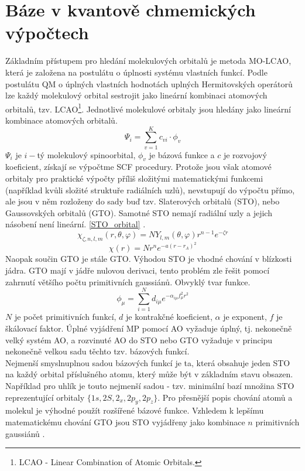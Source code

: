 \documentclass[
  digital, %
  table,   %
  lof,     %
  lot,     %
  oneside,
]{fithesis3}
\begin{document}
\section{Báze v kvantově chmemických výpočtech}
Základním přístupem pro hledání molekulových orbitalů je metoda MO-LCAO, která je založena na postulátu o úplnosti systému vlastních funkcí.
Podle postulátu QM o úplných vlastních hodnotách uplných Hermitovských operátorů lze každý molekulový orbital sestrojit jako lineární kombinaci atomových orbitalů, tzv. LCAO\footnote{LCAO - Linear Combination of Atomic Orbitals.}. Jednotlivé molekulové orbitaly jsou hledány jako lineární kombinace atomových orbitalů.
\begin{equation}
\Psi_i = \sum_{v=1}^{K}c_{vi} \cdot \phi_{v}
\end{equation}
$\Psi_i$ je $i-$tý molekulový spinoorbital, $\phi_{v}$ je bázová funkce a $c$ je rozvojový koeficient, získají se výpočtme SCF procedury. Protože jsou však atomové orbitaly pro praktické výpočty příliš složitými matematickými funkcemi (například kvůli složité struktuře radiálních uzlů), nevstupují do výpočtu přímo, ale jsou v něm rozloženy do sady buď tzv. Slaterových orbitalů (STO), nebo Gaussovských orbitalů (GTO). Samotné STO nemají radiální uzly a jejich násobení není lineární.
\ref{STO_orbital} \cite{jensen2007introduction}.
\begin{equation}
\chi_{\zeta, n, l, m}(r, \theta, \varphi) = NY_{l,m} (\theta, \varphi) r^{n-1} e^{-\zeta r}
\label{STO_orbital}
\end{equation}
\begin{equation}
\chi(r) = Nr^n e^{-a(r-r_A)^2}
\end{equation}
 Naopak součin GTO je stále GTO. Výhodou STO je vhodné chování v blízkosti jádra. GTO mají v jádře nulovou derivaci, tento problém zle řešit pomocí zahrnutí většího počtu primitivních gaussiánů. Obvyklý tvar funkce.
\begin{equation}
\phi_\mu = \sum_{i=1}^{N}d_{i\mu}e^{-\alpha_{i\mu}f^2_{\mu}r^2}
\end{equation}
$N$ je počet primitivních funkcí, $d$ je kontrakčné koeficient, $\alpha$ je exponent, $f$ je škálovací faktor.
Úplné vyjádření MP pomocí AO vyžaduje úplný, tj. nekonečně velký systém AO, a rozvinuté AO do STO nebo GTO vyžaduje v principu nekonečně velkou sadu těchto tzv. bázových funkcí.\\
Nejmenší smyslnuplnou sadou bázových funkcí je ta, která obsahuje jeden STO na každý orbital příslušného atomu, který může být v základním stavu obsazen. Například pro uhlík je touto nejmenší sadou - tzv. minimální bazí množina STO reprezentující orbitaly $\{1s, 2S, 2_x, 2p_y, 2p_z \}$. Pro přesnější popis chování atomů a molekul je výhodné použít rozšířené bázové funkce. Vzhledem k lepšímu matematickému chování GTO jsou STO vyjádřeny jako kombinace $n$ primitivních gaussiánů \cite{lowe2011quantum}.
\end{document}
